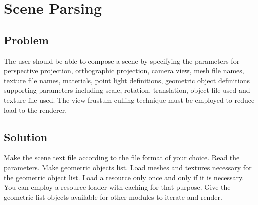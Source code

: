 \chapter{Scene Parsing}
\section{Problem}
The user should be able to compose a scene by specifying the parameters for perspective projection, orthographic projection, camera view, mesh file names, texture file names, materials, point light definitions, geometric object definitions supporting parameters including scale, rotation, translation, object file used and texture file used. The view frustum culling technique must be employed to reduce load to the renderer.
\section{Solution}
Make the scene text file according to the file format of your choice. Read the parameters. Make geometric objects list. Load meshes and textures necessary for the geometric object list. Load a resource only once and only if it is necessary. You can employ a resource loader with caching for that purpose. Give the geometric list objects available for other modules to iterate and render.
